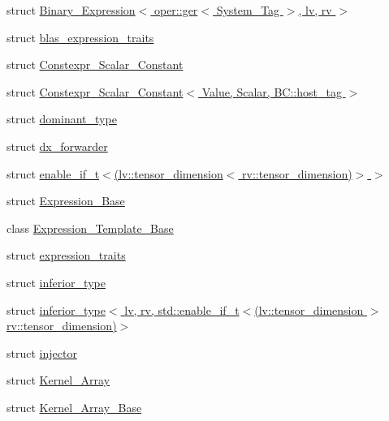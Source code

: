 \begin{DoxyCompactItemize}
\item 
struct \hyperlink{structBC_1_1tensors_1_1exprs_1_1Binary__Expression_3_01oper_1_1ger_3_01System__Tag_01_4_00_01lv_00_01rv_01_4}{Binary\+\_\+\+Expression$<$ oper\+::ger$<$ System\+\_\+\+Tag $>$, lv, rv $>$}
\item 
struct \hyperlink{structBC_1_1tensors_1_1exprs_1_1blas__expression__traits}{blas\+\_\+expression\+\_\+traits}
\item 
struct \hyperlink{structBC_1_1tensors_1_1exprs_1_1Constexpr__Scalar__Constant}{Constexpr\+\_\+\+Scalar\+\_\+\+Constant}
\item 
struct \hyperlink{structBC_1_1tensors_1_1exprs_1_1Constexpr__Scalar__Constant_3_01Value_00_01Scalar_00_01BC_1_1host__tag_01_4}{Constexpr\+\_\+\+Scalar\+\_\+\+Constant$<$ Value, Scalar, B\+C\+::host\+\_\+tag $>$}
\item 
struct \hyperlink{structBC_1_1tensors_1_1exprs_1_1dominant__type}{dominant\+\_\+type}
\item 
struct \hyperlink{structBC_1_1tensors_1_1exprs_1_1dx__forwarder}{dx\+\_\+forwarder}
\item 
struct \hyperlink{structBC_1_1tensors_1_1exprs_1_1dominant__type_3_01lv_00_01rv_00_01std_1_1enable__if__t_3_07lv_1db0f9672481671e57394dda5b6263147}{enable\+\_\+if\+\_\+t$<$(lv\+::tensor\+\_\+dimension$<$ rv\+::tensor\+\_\+dimension)$>$ $>$}
\item 
struct \hyperlink{structBC_1_1tensors_1_1exprs_1_1Expression__Base}{Expression\+\_\+\+Base}
\item 
class \hyperlink{classBC_1_1tensors_1_1exprs_1_1Expression__Template__Base}{Expression\+\_\+\+Template\+\_\+\+Base}
\item 
struct \hyperlink{structBC_1_1tensors_1_1exprs_1_1expression__traits}{expression\+\_\+traits}
\item 
struct \hyperlink{structBC_1_1tensors_1_1exprs_1_1inferior__type}{inferior\+\_\+type}
\item 
struct \hyperlink{structBC_1_1tensors_1_1exprs_1_1inferior__type_3_01lv_00_01rv_00_01std_1_1enable__if__t_3_07lv_1ac4e1cb1aa128aaa2801ec5ddab6405c}{inferior\+\_\+type$<$ lv, rv, std\+::enable\+\_\+if\+\_\+t$<$(lv\+::tensor\+\_\+dimension $>$ rv\+::tensor\+\_\+dimension)$>$}
\item 
struct \hyperlink{structBC_1_1tensors_1_1exprs_1_1injector}{injector}
\item 
struct \hyperlink{structBC_1_1tensors_1_1exprs_1_1Kernel__Array}{Kernel\+\_\+\+Array}
\item 
struct \hyperlink{structBC_1_1tensors_1_1exprs_1_1Kernel__Array__Base}{Kernel\+\_\+\+Array\+\_\+\+Base}

\end{DoxyCompactItemize}
